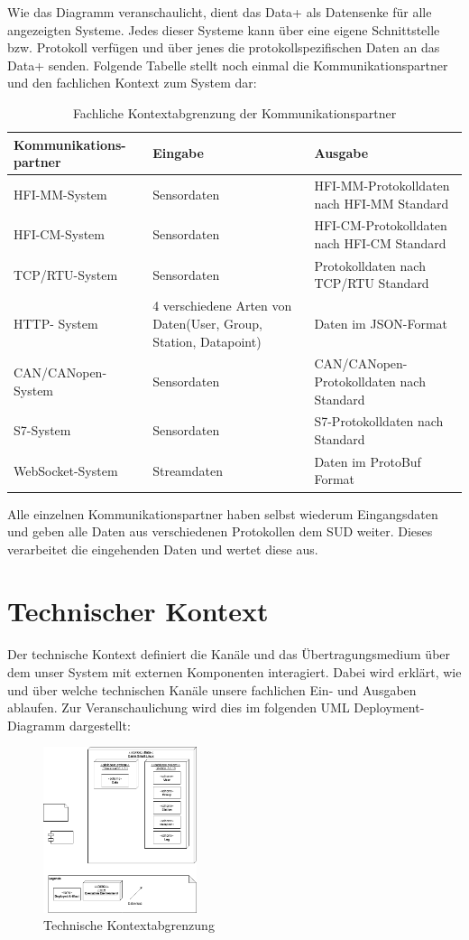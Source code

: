 Wie das Diagramm veranschaulicht, dient das Data+ als Datensenke für alle angezeigten Systeme. Jedes dieser Systeme kann über eine eigene Schnittstelle bzw. Protokoll verfügen und über jenes die protokollspezifischen Daten an das Data+ senden.
Folgende Tabelle stellt noch einmal die Kommunikationspartner und den fachlichen Kontext zum System dar:
\pagebreak
\begin{table}[h]
	\begin{tabularx}{\textwidth}{|p{3cm}|X|X|}
		\hline
		Kommunikations-
		partner & Eingabe & Ausgabe \\
		\hline
		HFI-MM-System & Sensordaten & HFI-MM-Protokolldaten nach HFI-MM Standard\\
		\hline
		HFI-CM-System & Sensordaten & HFI-CM-Protokolldaten nach HFI-CM Standard\\
		\hline
		TCP/RTU-System & Sensordaten & Protokolldaten nach TCP/RTU Standard \\
		\hline
		HTTP-
		System & 4 verschiedene Arten von Daten(User, Group, Station, Datapoint) & Daten im JSON-Format \\
		\hline
		CAN/CANopen-
		System & Sensordaten & CAN/CANopen-Protokolldaten nach Standard\\
		\hline
		S7-System & Sensordaten & S7-Protokolldaten nach Standard\\
		\hline
		WebSocket-System & Streamdaten & Daten im ProtoBuf Format\\
		\hline
	\end{tabularx} 
	\caption{Fachliche Kontextabgrenzung der Kommunikationspartner}
	\label{tab:FachlicheKontextabgrenzungDerKommunikationspartner}
\end{table}

Alle einzelnen Kommunikationspartner haben selbst wiederum Eingangsdaten und geben alle Daten aus verschiedenen Protokollen dem SUD weiter. Dieses verarbeitet die eingehenden Daten und wertet diese aus.

\section{Technischer Kontext}
Der technische Kontext definiert die Kanäle und das Übertragungsmedium über dem unser System mit externen Komponenten interagiert. Dabei wird erklärt, wie und über welche technischen Kanäle unsere fachlichen Ein- und Ausgaben ablaufen. Zur Veranschaulichung wird dies im folgenden UML Deployment-Diagramm dargestellt:

\begin{figure}[h]
	\centering
	\includegraphics[width=0.4\textwidth]{Graphics/technische_kontextabgrenzung.png}
	\caption{Technische Kontextabgrenzung}
	\label{fig:technische_kontextabgrenzung}
\end{figure}